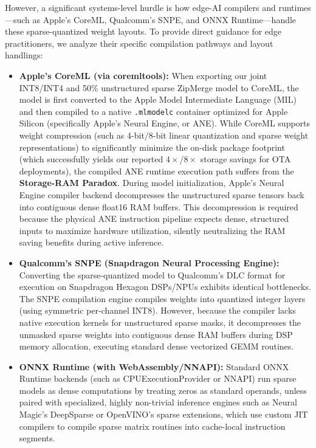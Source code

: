 However, a significant systems-level hurdle is how edge-AI compilers and runtimes—such as Apple's CoreML, Qualcomm's SNPE, and ONNX Runtime—handle these sparse-quantized weight layouts. To provide direct guidance for edge practitioners, we analyze their specific compilation pathways and layout handlings:
\begin{itemize}[leftmargin=*]
    \item \textbf{Apple's CoreML (via coremltools):} When exporting our joint INT8/INT4 and 50\% unstructured sparse ZipMerge model to CoreML, the model is first converted to the Apple Model Intermediate Language (MIL) and then compiled to a native \texttt{.mlmodelc} container optimized for Apple Silicon (specifically Apple's Neural Engine, or ANE). While CoreML supports weight compression (such as 4-bit/8-bit linear quantization and sparse weight representations) to significantly minimize the on-disk package footprint (which successfully yields our reported $4\times$/$8\times$ storage savings for OTA deployments), the compiled ANE runtime execution path suffers from the \textbf{Storage-RAM Paradox}. During model initialization, Apple's Neural Engine compiler backend decompresses the unstructured sparse tensors back into contiguous dense float16 RAM buffers. This decompression is required because the physical ANE instruction pipeline expects dense, structured inputs to maximize hardware utilization, silently neutralizing the RAM saving benefits during active inference.
    \item \textbf{Qualcomm's SNPE (Snapdragon Neural Processing Engine):} Converting the sparse-quantized model to Qualcomm's DLC format for execution on Snapdragon Hexagon DSPs/NPUs exhibits identical bottlenecks. The SNPE compilation engine compiles weights into quantized integer layers (using symmetric per-channel INT8). However, because the compiler lacks native execution kernels for unstructured sparse masks, it decompresses the unmasked sparse weights into contiguous dense RAM buffers during DSP memory allocation, executing standard dense vectorized GEMM routines.
    \item \textbf{ONNX Runtime (with WebAssembly/NNAPI):} Standard ONNX Runtime backends (such as CPUExecutionProvider or NNAPI) run sparse models as dense computations by treating zeros as standard operands, unless paired with specialized, highly non-trivial inference engines such as Neural Magic's DeepSparse or OpenVINO's sparse extensions, which use custom JIT compilers to compile sparse matrix routines into cache-local instruction segments.
\end{itemize}
